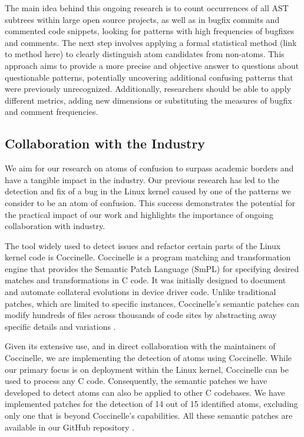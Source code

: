 \documentclass[conference]{IEEEtran}
\begin{document}
The main idea behind this ongoing research is to count occurrences of all AST subtrees within large open source projects, as well as in bugfix commits and commented code snippets, looking for patterns with high frequencies of bugfixes and comments. The next step involves applying a formal statistical method (link to method here) to clearly distinguish atom candidates from non-atoms. This approach aims to provide a more precise and objective answer to questions about questionable patterns, potentially uncovering additional confusing patterns that were previously unrecognized. Additionally, researchers should be able to apply different metrics, adding new dimensions or substituting the measures of bugfix and comment frequencies.


\subsection{Collaboration with the Industry}

We aim for our research on atoms of confusion to surpass academic borders and have a tangible impact in the industry. Our previous research has led to the detection and fix of a bug in the Linux kernel caused by one of the patterns we consider to be an atom of confusion. This success demonstrates the potential for the practical impact of our work and highlights the importance of ongoing collaboration with industry.

The tool widely used to detect issues and refactor certain parts of the Linux kernel code is Coccinelle. Coccinelle is a program matching and transformation engine that provides the Semantic Patch Language (SmPL) for specifying desired matches and transformations in C code. It was initially designed to document and automate collateral evolutions in device driver code. Unlike traditional patches, which are limited to specific instances, Coccinelle's semantic patches can modify hundreds of files across thousands of code sites by abstracting away specific details and variations \cite{coccinelle}.

Given its extensive use, and in direct collaboration with the maintainers of Coccinelle, we are implementing the detection of atoms using Coccinelle. While our primary focus is on deployment within the Linux kernel, Coccinelle can be used to process any C code. Consequently, the semantic patches we have developed to detect atoms can also be applied to other C codebases. We have implemented patches for the detection of 14 out of 15 identified atoms, excluding only one that is beyond Coccinelle's capabilities. All these semantic patches are available in our GitHub repository \cite{githubcocci}. 
\end{document}
